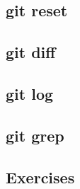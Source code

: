 \subsection{git reset}
\begin{frame}[fragile]
    \subslidetitle
\end{frame}

\subsection{git diff}
\begin{frame}[fragile]
    \subslidetitle
\end{frame}

\subsection{git log}
\begin{frame}[fragile]
    \subslidetitle
\end{frame}

\subsection{git grep}
\begin{frame}[fragile]
    \subslidetitle
\end{frame}

\subsection{Exercises}
\begin{frame}[fragile]
  \subslidetitle
\end{frame}
